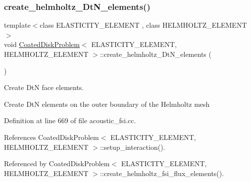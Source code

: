 \subsubsection{\texorpdfstring{create\+\_\+helmholtz\+\_\+\+Dt\+N\+\_\+elements()}{create\_helmholtz\_DtN\_elements()}}
{\footnotesize\ttfamily template$<$class E\+L\+A\+S\+T\+I\+C\+I\+T\+Y\+\_\+\+E\+L\+E\+M\+E\+NT , class H\+E\+L\+M\+H\+O\+L\+T\+Z\+\_\+\+E\+L\+E\+M\+E\+NT $>$ \\
void \hyperlink{classCoatedDiskProblem}{Coated\+Disk\+Problem}$<$ E\+L\+A\+S\+T\+I\+C\+I\+T\+Y\+\_\+\+E\+L\+E\+M\+E\+NT, H\+E\+L\+M\+H\+O\+L\+T\+Z\+\_\+\+E\+L\+E\+M\+E\+NT $>$\+::create\+\_\+helmholtz\+\_\+\+Dt\+N\+\_\+elements (\begin{DoxyParamCaption}{ }\end{DoxyParamCaption})\hspace{0.3cm}{\ttfamily [private]}}



Create DtN face elements. 

Create DtN elements on the outer boundary of the Helmholtz mesh 

Definition at line 669 of file acoustic\+\_\+fsi.\+cc.



References Coated\+Disk\+Problem$<$ E\+L\+A\+S\+T\+I\+C\+I\+T\+Y\+\_\+\+E\+L\+E\+M\+E\+N\+T, H\+E\+L\+M\+H\+O\+L\+T\+Z\+\_\+\+E\+L\+E\+M\+E\+N\+T $>$\+::setup\+\_\+interaction().



Referenced by Coated\+Disk\+Problem$<$ E\+L\+A\+S\+T\+I\+C\+I\+T\+Y\+\_\+\+E\+L\+E\+M\+E\+N\+T, H\+E\+L\+M\+H\+O\+L\+T\+Z\+\_\+\+E\+L\+E\+M\+E\+N\+T $>$\+::create\+\_\+helmholtz\+\_\+fsi\+\_\+flux\+\_\+elements().

\mbox{\label{classCoatedDiskProblem_a34f61c03b152f2ac06e1e771b0dbe09b}} 
